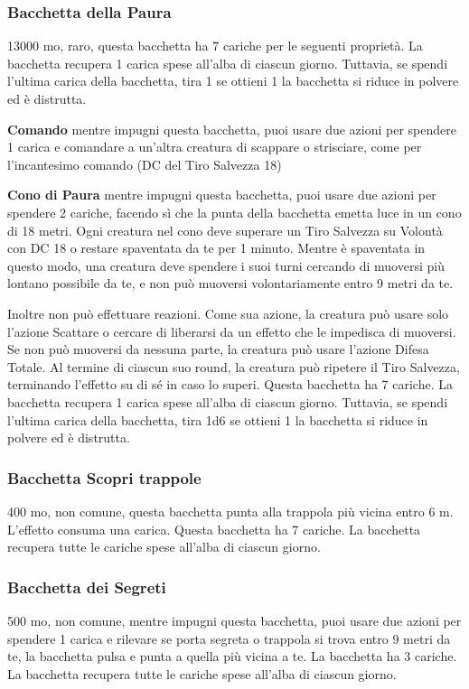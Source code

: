 \begin{multicols}{2}
\subsubsection*{Bacchetta della Paura}
13000 mo, raro, questa bacchetta ha 7 cariche per le seguenti proprietà. La bacchetta recupera 1 carica spese all'alba di ciascun giorno. Tuttavia, se spendi l'ultima carica della bacchetta, tira 1 se ottieni 1 la bacchetta si riduce in polvere ed è distrutta.

\textbf{Comando} mentre impugni questa bacchetta, puoi usare due azioni per spendere 1 carica e comandare a un'altra creatura di scappare o strisciare, come per l'incantesimo comando (DC del Tiro Salvezza 18)

\textbf{Cono di Paura} mentre impugni questa bacchetta, puoi usare due azioni per spendere 2 cariche, facendo sì che la punta della bacchetta emetta luce in un cono di 18 metri. Ogni creatura nel cono deve superare un Tiro Salvezza su Volontà con DC 18 o restare spaventata da te per 1 minuto. Mentre è spaventata in questo modo, una creatura deve spendere i suoi turni cercando di muoversi più lontano possibile da te, e non può muoversi volontariamente entro 9 metri da te.

Inoltre non può effettuare reazioni. Come sua azione, la creatura può usare solo l'azione Scattare o cercare di liberarsi da un effetto che le impedisca di muoversi. Se non può muoversi da nessuna parte, la creatura può usare l'azione Difesa Totale. Al termine di ciascun suo round, la creatura può ripetere il Tiro Salvezza, terminando l'effetto su di sé in caso lo superi. Questa bacchetta ha 7 cariche. La bacchetta recupera 1 carica spese all'alba di ciascun giorno. Tuttavia, se spendi l'ultima carica della bacchetta, tira 1d6 se ottieni 1 la bacchetta si riduce in polvere ed è distrutta.

\subsubsection*{Bacchetta Scopri trappole}
400 mo, non comune, questa bacchetta punta alla trappola più vicina entro 6 m. L'effetto consuma una carica. Questa bacchetta ha 7 cariche. La bacchetta recupera tutte le cariche spese all'alba di ciascun giorno.

\subsubsection*{Bacchetta dei Segreti}
500 mo, non comune, mentre impugni questa bacchetta, puoi usare due azioni per spendere 1 carica e rilevare se porta segreta o trappola si trova entro 9 metri da te, la bacchetta pulsa e punta a quella più vicina a te. La bacchetta ha 3 cariche. La bacchetta recupera tutte le cariche spese all'alba di ciascun giorno.



\end{multicols}
